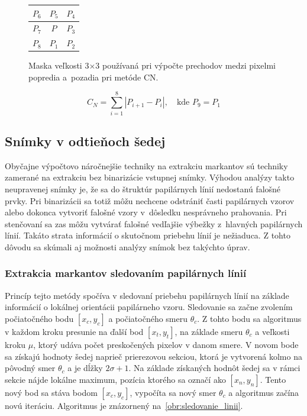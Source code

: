   \begin{figure}[h]
    \centering
      \begin{tabular}{ | l | c | r | }
        \hline
        $P_6$ & $P_5$ & $P_4$ \\ \hline
        $P_7$ & $P$ & $P_3$ \\ \hline
        $P_8$ & $P_1$ & $P_2$ \\
        \hline
      \end{tabular}
    \caption{Maska veľkosti $3$$\times{}$$3$ používaná pri výpočte prechodov medzi pixelmi popredia a~pozadia pri metóde CN.}
    \label{obr:maska_CN}
  \end{figure}

  \begin{equation}
    C_N = \sum_{i=1}^{8} | P_{i+1} - P_{i} |, \quad\text{kde } P_9 = P_1
    \label{rov:crossing_number}
  \end{equation}

  \subsection{Snímky v odtieňoch šedej}
  Obyčajne výpočtovo náročnejšie techniky na extrakciu markantov sú techniky zamerané na extrakciu bez binarizácie vstupnej snímky. Výhodou analýzy
  takto neupravenej snímky je, že sa do štruktúr papilárnych línií nedostanú falošné prvky. Pri binarizácii sa totiž môžu nechcene odstrániť časti
  papilárnych vzorov alebo dokonca vytvoriť falošné vzory v~dôsledku nesprávneho prahovania. Pri stenčovaní sa zas môžu vytvárať falošné vedľajšie výbežky
  z~hlavných papilárnych línií. Takáto strata informácií o skutočnom priebehu línií je nežiaduca. Z tohto dôvodu sa skúmali aj možnosti analýzy snímok bez
  takýchto úprav.

  \subsubsection*{Extrakcia markantov sledovaním papilárnych línií}
  Princíp tejto metódy spočíva v sledovaní priebehu papilárnych línií na základe informácií o lokálnej orientácii papilárneho vzoru. Sledovanie sa začne
  zvolením počiatočného bodu $[x_c, y_c]$ a počiatočného smeru $\theta{}_c$. Z tohto bodu sa algoritmus v každom kroku presunie na ďalší bod $[x_t, y_t]$,
  na základe smeru $\theta{}_c$ a veľkosti kroku $\mu$, ktorý udáva počet preskočených pixelov v danom smere. V novom bode sa získajú hodnoty šedej
  naprieč prierezovou sekciou, ktorá je vytvorená kolmo na pôvodný smer $\theta{}_c$ a je dĺžky $2\sigma + 1$. Na základe získaných hodnôt šedej sa
  v rámci sekcie nájde lokálne maximum, pozícia ktorého sa označí ako $[x_n, y_n]$. Tento nový bod sa stáva bodom $[x_c, y_c]$,
  vypočíta sa nový smer $\theta{}_c$ a algoritmus začína novú iteráciu. Algoritmus je znázornený na~{\ref{obr:sledovanie_linii}}.

